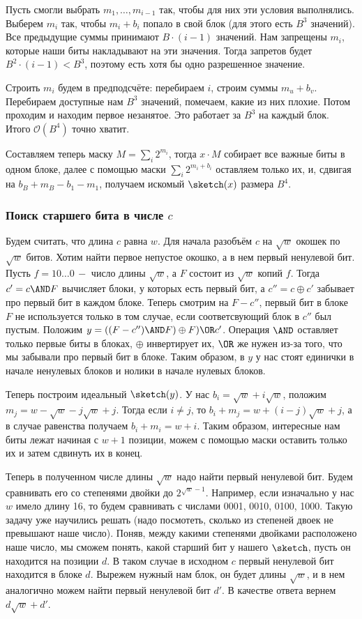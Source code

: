 Пусть смогли выбрать $m_1, \ldots, m_{i-1}$ так, чтобы для них эти условия выполнялись. Выберем $m_i$ так, чтобы $m_i + b_i$ попало в свой блок (для этого есть $B^3$ значений). Все предыдущие суммы принимают $B\cdot(i-1)$ значений. Нам запрещены $m_i$, которые наши биты накладывают на эти значения. Тогда запретов будет $B^2\cdot(i-1) < B^3$, поэтому есть хотя бы одно разрешенное значение.

Строить $m_i$ будем в предподсчёте: перебираем $i$, строим суммы $m_u + b_v$. Перебираем доступные нам $B^3$ значений, помечаем, какие из них плохие. Потом проходим и находим первое незанятое. Это работает за $B^3$ на каждый блок. Итого $\mathcal{O}(B^4)$ точно хватит.

Составляем теперь маску $M = \sum_i 2^{m_i}$, тогда $x\cdot M$ собирает все важные биты в одном блоке, далее с помощью маски $\sum_i 2^{m_i + b_i}$ оставляем только их, и, сдвигая на $b_B+m_B-b_1-m_1$, получаем искомый $\sketch(x)$ размера $B^4$.

\subsubsection{Поиск старшего бита в числе $c$}
Будем считать, что длина $c$ равна $w$.
Для начала разобъём $c$ на $\sqrt{w}$ окошек по $\sqrt{w}$ битов. Хотим найти первое непустое окошко, а в нем первый ненулевой бит. Пусть $f = 10\ldots0 \, -$ число длины $\sqrt{w}$, а $F$ состоит из $\sqrt{w}$ копий $f$. Тогда $c' = c \AND F$ вычисляет блоки, у которых есть первый бит, а $c'' = c \oplus c'$ забывает про первый бит в каждом блоке. Теперь смотрим на $F - c''$, первый бит в блоке $F$ не используется только в том случае, если соответсвующий блок в $c''$ был пустым. Положим $y = ((F - c'') \AND F) \oplus F) \OR c'$. Операция $\AND$ оставляет только первые биты в блоках, $\oplus$ инвертирует их, $\OR$ же нужен из-за того, что мы забывали про первый бит в блоке. Таким образом, в $y$ у нас стоят единички в начале ненулевых блоков и нолики в начале нулевых блоков.

Теперь построим идеальный $\sketch(y)$. У нас $b_i = \sqrt{w} + i\sqrt{w}$, положим $m_j = w - \sqrt{w} - j\sqrt{w} + j$. Тогда если $i \neq j$, то $b_i + m_j = w + (i-j)\sqrt{w} + j$, а в случае равенства получаем $b_i + m_i = w + i$. Таким образом, интересные нам биты лежат начиная с $w+1$ позиции, можем с помощью маски оставить только их и затем сдвинуть их в конец.

Теперь в полученном числе длины $\sqrt{w}$ надо найти первый ненулевой бит. Будем сравнивать его со степенями двойки до $2^{\sqrt{w}-1}$. Например, если изначально у нас $w$ имело длину 16, то будем сравнивать с числами 0001, 0010, 0100, 1000. Такую задачу уже научились решать (надо посмотеть, сколько из степеней двоек не превышают наше число). Поняв, между какими степенями двойками расположено наше число, мы сможем понять, какой старший бит у нашего $\sketch$, пусть он находится на позиции $d$. В таком случае в исходном $c$ первый ненулевой бит находится в блоке $d$. Вырежем нужный нам блок, он будет длины $\sqrt{w}$, и в нем аналогично можем найти первый ненулевой бит $d'$. В качестве ответа вернем $d\sqrt{w} + d'$.

